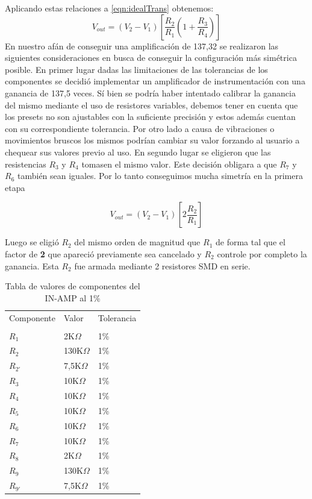 \documentclass[a4paper]{article}
\begin{document}
	Aplicando estas relaciones a \eqref{eqn:idealTrans} obtenemos:
	\begin{equation}
		V_{out} = (V_2-V_1)\left[\frac{R_2}{R_1}(1+\frac{R_3}{R_4})\right]
	\end{equation}
En nuestro afán de conseguir una amplificación de 137,32 se realizaron las siguientes consideraciones en busca de conseguir la configuración más simétrica posible.
En primer lugar dadas las limitaciones de las tolerancias de los componentes se decidió implementar un amplificador de instrumentación con una ganancia de 137,5 veces. Sí bien se podría haber intentado calibrar la ganancia del mismo mediante el uso de resistores variables, debemos tener en cuenta que los presets no son ajustables con la suficiente precisión y estos además cuentan con su correspondiente tolerancia. Por otro lado a causa de vibraciones o movimientos bruscos los mismos podrían cambiar su valor forzando al usuario a chequear sus valores previo al uso. 
En segundo lugar se eligieron que las resistencias $R_3$ y  $R_4$ tomasen el mismo valor. Este decisión obligara a que $R_7$ y  $R_6$ también sean iguales. Por lo tanto conseguimos mucha simetría en la primera etapa

\begin{equation}
	V_{out} = (V_2-V_1)\left[2 \frac{R_2}{R_1}\right]
\end{equation}

Luego se eligió $R_2$ del mismo orden de magnitud que $R_1$ de forma tal que el factor de \textbf{2} que apareció previamente sea cancelado y $R_2$ controle por completo la ganancia. Esta $R_2$ fue armada mediante 2 resistores SMD en serie.

\begin{table}[H]
	\centering
	\begin{tabular}{lll}
		Componente  & Valor        	   & Tolerancia \\
		\\
		$R_1$       & 2K$\Omega$   	   & 1\%        \\
		$R_2$       & 130K$\Omega$ 	   & 1\%        \\
		$R_{2'}$  	& 7,5K$\Omega$     & 1\%        \\
		$R_3$ 		& 10K$\Omega$      & 1\%		\\
		$R_4$		& 10K$\Omega$      & 1\%        \\
	    $R_5$		& 10K$\Omega$      & 1\%        \\
	    $R_6$		& 10K$\Omega$      & 1\%        \\
	    $R_7$		& 10K$\Omega$      & 1\%        \\
	    $R_8$		& 2K$\Omega$       & 1\%        \\
 	    $R_9$		& 130K$\Omega$     & 1\%        \\   
		$R_{9'}$	& 7,5K$\Omega$     & 1\%        \\
			\end{tabular}
		\caption{Tabla de valores de componentes del IN-AMP al 1\%}
\end{table}
\end{document}
